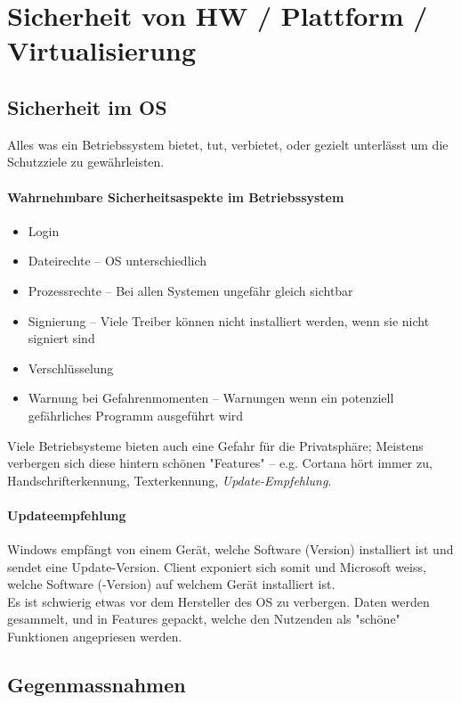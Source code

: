 \documentclass[a4paper,12pt]{article}
\begin{document}
\newpage
\section{Sicherheit von HW / Plattform / Virtualisierung}

\subsection{Sicherheit im OS}
Alles was ein Betriebssystem bietet, tut, verbietet, oder gezielt unterlässt um die Schutzziele zu gewährleisten.

\paragraph{Wahrnehmbare Sicherheitsaspekte im Betriebssystem}
\begin{itemize}
\item Login
\item Dateirechte -- OS unterschiedlich
\item Prozessrechte -- Bei allen Systemen ungefähr gleich sichtbar
\item Signierung -- Viele Treiber können nicht installiert werden, wenn sie nicht signiert sind
\item Verschlüsselung
\item Warnung bei Gefahrenmomenten -- Warnungen wenn ein potenziell gefährliches Programm ausgeführt wird
\end{itemize}

Viele Betriebsysteme bieten auch eine Gefahr für die Privatsphäre; Meistens verbergen sich diese hintern schönen "Features" -- e.g. Cortana hört immer zu, Handschrifterkennung, Texterkennung, \emph{Update-Empfehlung}.

\paragraph{Updateempfehlung}
Windows empfängt von einem Gerät, welche Software (Version) installiert ist und sendet eine Update-Version. Client exponiert sich somit und Microsoft weiss, welche Software (-Version) auf welchem Gerät installiert ist.\\

Es ist schwierig etwas vor dem Hersteller des OS zu verbergen. Daten werden gesammelt, und in Features gepackt, welche den Nutzenden als "schöne" Funktionen angepriesen werden.

\subsection{Gegenmassnahmen}
\end{document}
